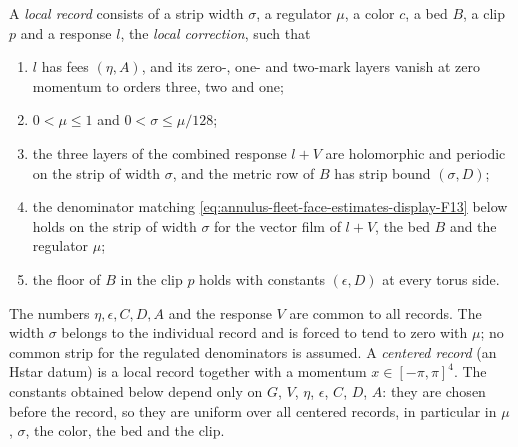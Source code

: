 A \emph{local record}
consists of a strip width $\sigma$, a regulator $\mu$, a color $c$, a
bed $B$, a clip $p$ and a response $l$, the \emph{local correction},
such that
\begin{enumerate}
\item $l$ has fees $(\eta,A)$, and its zero-, one- and two-mark layers
  vanish at zero momentum to orders three, two and one;
\item $0<\mu\leq1$ and $0<\sigma\leq\mu/128$;
\item the three layers of the combined response $l+V$ are holomorphic
  and periodic on the strip of width $\sigma$, and the metric row of
  $B$ has strip bound $(\sigma,D)$;
\item the denominator matching \eqref{eq:annulus-fleet-face-estimates-display-F13} below holds on the strip of width
  $\sigma$ for the vector film of $l+V$, the bed $B$ and the regulator
  $\mu$;
\item the floor of $B$ in the clip $p$ holds with constants
  $(\epsilon,D)$ at every torus side.
\end{enumerate}
The numbers $\eta,\epsilon,C,D,A$ and the response $V$ are common to all
records. The width $\sigma$ belongs to the individual record and is
forced to tend to zero with $\mu$; no common strip for the regulated
denominators is assumed. A \emph{centered record} (an Hstar datum) is a
local record together with a momentum $x\in[-\pi,\pi]^4$. The constants
obtained below depend only on $G$, $V$, $\eta$, $\epsilon$, $C$, $D$,
$A$: they are chosen before the record, so they are uniform over all
centered records, in particular in $\mu$, $\sigma$, the color, the bed
and the clip.

